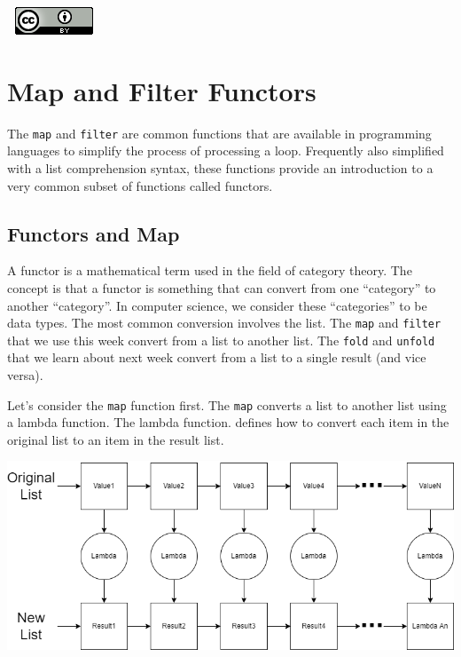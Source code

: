 \documentclass[
]{book}
\begin{document}
\(\nonumber\)
\(\nonumber\)
\href{http://creativecommons.org/licenses/by/4.0/}{\includegraphics{images/cc-88x31.png}}

\hypertarget{map-and-filter-functors}{%
\chapter{Map and Filter Functors}\label{map-and-filter-functors}}

The \texttt{map} and \texttt{filter} are common functions that are available in programming languages to simplify the process of processing a loop. Frequently also simplified with a list comprehension syntax, these functions provide an introduction to a very common subset of functions called functors.

\hypertarget{functors-and-map}{%
\section{Functors and Map}\label{functors-and-map}}

A functor is a mathematical term used in the field of category theory. The concept is that a functor is something that can convert from one ``category'' to another ``category''. In computer science, we consider these ``categories'' to be data types. The most common conversion involves the list. The \texttt{map} and \texttt{filter} that we use this week convert from a list to another list. The \texttt{fold} and \texttt{unfold} that we learn about next week convert from a list to a single result (and vice versa).

Let's consider the \texttt{map} function first. The \texttt{map} converts a list to another list using a lambda function. The lambda function. defines how to convert each item in the original list to an item in the result list.

\includegraphics{images/map.drawio.png}
\end{document}
